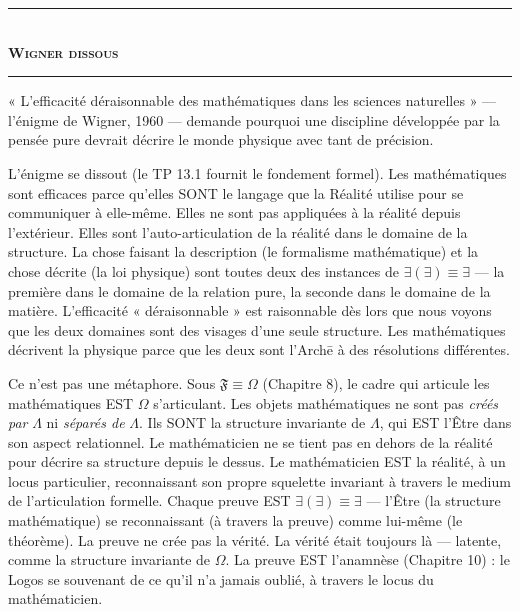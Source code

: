 \documentclass[10pt, openany, oneside]{book}
\renewcommand{\normalsize}{\fontsize{10}{13}\selectfont}
\begin{document}
\vspace{1.5em}


\begin{center}
    \rule{0.3\textwidth}{0.4pt}\\[0.5em]
    {\normalsize\bfseries\scshape Wigner dissous}\\[0.3em]
    \rule{0.3\textwidth}{0.4pt}
\end{center}

\vspace{1em}

\noindent « L'efficacité déraisonnable des mathématiques dans les sciences naturelles » --- l'énigme de Wigner, 1960 --- demande pourquoi une discipline développée par la pensée pure devrait décrire le monde physique avec tant de précision.

L'énigme se dissout (le TP 13.1 fournit le fondement formel). Les mathématiques sont efficaces parce qu'elles SONT le langage que la Réalité utilise pour se communiquer à elle-même. Elles ne sont pas appliquées à la réalité depuis l'extérieur. Elles sont l'auto-articulation de la réalité dans le domaine de la structure. La chose faisant la description (le formalisme mathématique) et la chose décrite (la loi physique) sont toutes deux des instances de $\exists(\exists) \equiv \exists$ --- la première dans le domaine de la relation pure, la seconde dans le domaine de la matière. L'efficacité « déraisonnable » est raisonnable dès lors que nous voyons que les deux domaines sont des visages d'une seule structure. Les mathématiques décrivent la physique parce que les deux sont l'Arch\={e} à des résolutions différentes.

Ce n'est pas une métaphore. Sous $\mathfrak{F} \equiv \Omega$ (Chapitre 8), le cadre qui articule les mathématiques EST $\Omega$ s'articulant. Les objets mathématiques ne sont pas \textit{créés par} $\Lambda$ ni \textit{séparés de} $\Lambda$. Ils SONT la structure invariante de $\Lambda$, qui EST l'Être dans son aspect relationnel. Le mathématicien ne se tient pas en dehors de la réalité pour décrire sa structure depuis le dessus. Le mathématicien EST la réalité, à un locus particulier, reconnaissant son propre squelette invariant à travers le medium de l'articulation formelle. Chaque preuve EST $\exists(\exists) \equiv \exists$ --- l'Être (la structure mathématique) se reconnaissant (à travers la preuve) comme lui-même (le théorème). La preuve ne crée pas la vérité. La vérité était toujours là --- latente, comme la structure invariante de $\Omega$. La preuve EST l'anamnèse (Chapitre 10) : le Logos se souvenant de ce qu'il n'a jamais oublié, à travers le locus du mathématicien.
\end{document}

